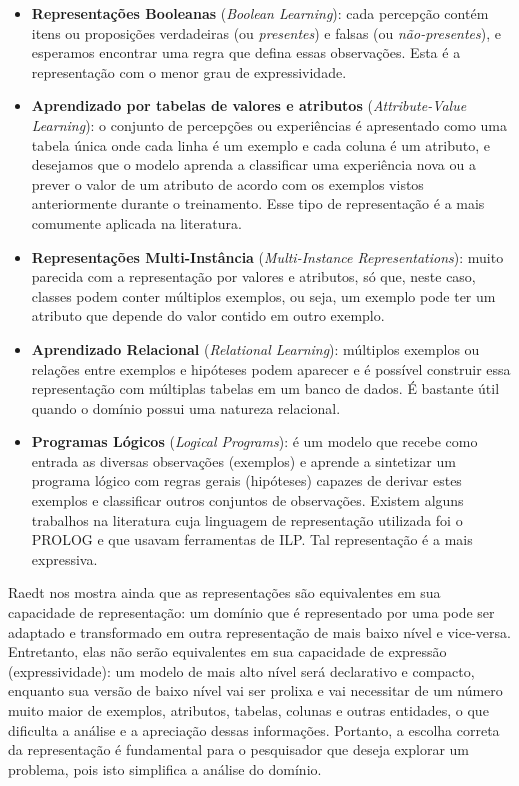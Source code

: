 \begin{itemize}
    \item \textbf{Representações Booleanas} (\textit{Boolean Learning}): cada percepção contém itens ou proposições verdadeiras (ou \textit{presentes}) e falsas (ou \textit{não-presentes}), e esperamos encontrar uma regra que defina essas observações. Esta é a representação com o menor grau de expressividade.
    \item \textbf{Aprendizado por tabelas de valores e atributos} (\textit{Attribute-Value Learning}): o conjunto de percepções ou experiências é apresentado como uma tabela única onde cada linha é um exemplo e cada coluna é um atributo, e desejamos que o modelo aprenda a classificar uma experiência nova ou a prever o valor de um atributo de acordo com os exemplos vistos anteriormente durante o treinamento. Esse tipo de representação é a mais comumente aplicada na literatura.
    \item \textbf{Representações Multi-Instância} (\textit{Multi-Instance Representations}): muito parecida com a representação por valores e atributos, só que, neste caso, classes podem conter múltiplos exemplos, ou seja, um exemplo pode ter um atributo que depende do valor contido em outro exemplo.
    \item \textbf{Aprendizado Relacional} (\textit{Relational Learning}): múltiplos exemplos ou relações entre exemplos e hipóteses podem aparecer e é possível construir essa representação com múltiplas tabelas em um banco de dados. É bastante útil quando o domínio possui uma natureza relacional.
    \item \textbf{Programas Lógicos} (\textit{Logical Programs}): é um modelo que recebe como entrada as diversas observações (exemplos) e aprende a sintetizar um programa lógico com regras gerais (hipóteses) capazes de derivar estes exemplos e classificar outros conjuntos de observações. Existem alguns trabalhos na literatura cuja linguagem de representação utilizada foi o PROLOG e que usavam ferramentas de ILP. Tal representação é a mais expressiva.
\end{itemize}

Raedt nos mostra ainda que as representações são equivalentes em sua capacidade de representação: um domínio que é representado por uma pode ser adaptado e transformado em outra representação de mais baixo nível e vice-versa. Entretanto, elas não serão equivalentes em sua capacidade de expressão (expressividade): um modelo de mais alto nível será declarativo e compacto, enquanto sua versão de baixo nível vai ser prolixa e vai necessitar de um número muito maior de exemplos, atributos, tabelas, colunas e outras entidades, o que dificulta a análise e a apreciação dessas informações. Portanto, a escolha correta da representação é fundamental para o pesquisador que deseja explorar um problema, pois isto simplifica a análise do domínio.

